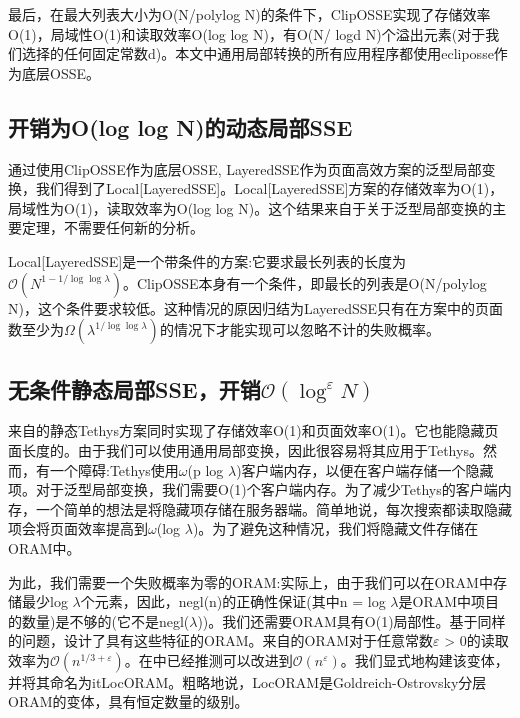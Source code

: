 \documentclass[UTF8]{article}
\begin{document}
最后，在最大列表大小为O(N/polylog N)的条件下，ClipOSSE实现了存储效率O(1)，局域性O(1)和读取效率O(log log N)，有O(N/ logd N)个溢出元素(对于我们选择的任何固定常数d)。本文中通用局部转换的所有应用程序都使用ecliposse作为底层OSSE。

\subsection{开销为O(log log N)的动态局部SSE}
通过使用ClipOSSE作为底层OSSE, LayeredSSE作为页面高效方案的泛型局部变换，我们得到了Local[LayeredSSE]。Local[LayeredSSE]方案的存储效率为O(1)，局域性为O(1)，读取效率为O(log log N)。这个结果来自于关于泛型局部变换的主要定理，不需要任何新的分析。

Local[LayeredSSE]是一个带条件的方案:它要求最长列表的长度为$\mathcal{O}\left(N^{1-1 / \log \log \lambda}\right)$。ClipOSSE本身有一个条件，即最长的列表是O(N/polylog N)，这个条件要求较低。这种情况的原因归结为LayeredSSE只有在方案中的页面数至少为$\Omega\left(\lambda^{1 / \log \log \lambda}\right)$的情况下才能实现可以忽略不计的失败概率。

\subsection{无条件静态局部SSE，开销$\mathcal{O}\left(\log ^{\varepsilon} N\right)$}
来自\cite{AngleBossuat2021SSEAS}的静态Tethys方案同时实现了存储效率O(1)和页面效率O(1)。它也能隐藏页面长度的。由于我们可以使用通用局部变换，因此很容易将其应用于Tethys。然而，有一个障碍:Tethys使用$\omega$(p log $\lambda$)客户端内存，以便在客户端存储一个隐藏项。对于泛型局部变换，我们需要O(1)个客户端内存。为了减少Tethys的客户端内存，一个简单的想法是将隐藏项存储在服务器端。简单地说，每次搜索都读取隐藏项会将页面效率提高到$\omega$(log $\lambda$)。为了避免这种情况，我们将隐藏文件存储在ORAM中。

为此，我们需要一个失败概率为零的ORAM:实际上，由于我们可以在ORAM中存储最少log $\lambda$个元素，因此，negl(n)的正确性保证(其中n = log $\lambda$是ORAM中项目的数量)是不够的(它不是negl($\lambda$))。我们还需要ORAM具有O(1)局部性。基于同样的问题，\cite{IoannisDemertzis2018SearchableEW}设计了具有这些特征的ORAM。来自\cite{IoannisDemertzis2018SearchableEW}的ORAM对于任意常数$\varepsilon$ > 0的读取效率为$\mathcal{O}\left(n^{1 / 3+\varepsilon}\right)$。在\cite{IoannisDemertzis2018SearchableEW}中已经推测可以改进到$\mathcal{O}\left(n^{\varepsilon}\right)$。我们显式地构建该变体，并将其命名为itLocORAM。粗略地说，LocORAM是Goldreich-Ostrovsky分层ORAM的变体，具有恒定数量的级别。
\end{document}
